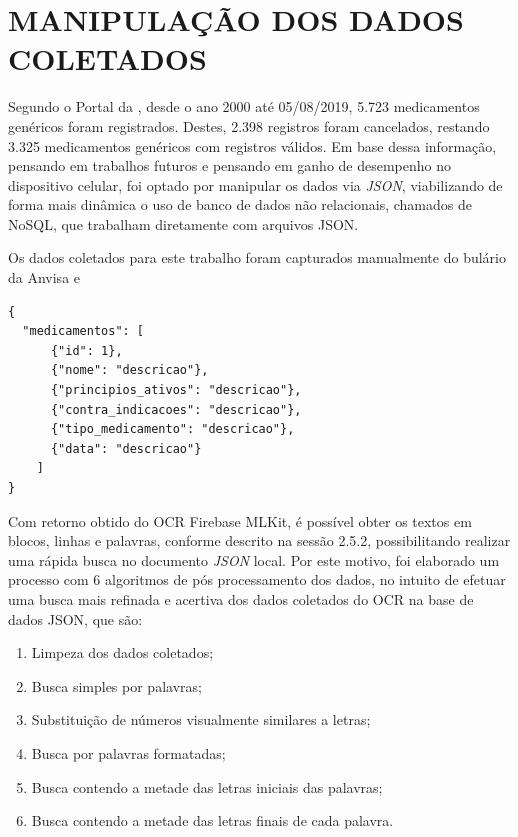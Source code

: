\section{MANIPULAÇÃO DOS DADOS COLETADOS}

Segundo o Portal da , desde o ano 2000 até 05/08/2019, 5.723 medicamentos genéricos foram registrados. Destes, 2.398 registros foram cancelados, restando 3.325 medicamentos genéricos com registros válidos. Em base dessa informação, pensando em trabalhos futuros e pensando em ganho de desempenho no dispositivo celular, foi optado por manipular os dados via \textit{JSON}, viabilizando de forma mais dinâmica o uso de banco de dados não relacionais, chamados de NoSQL, que trabalham diretamente com arquivos JSON.

Os dados coletados para este trabalho foram capturados manualmente do bulário da Anvisa e %

\begin{lstlisting}[firstnumber=1]
{
  "medicamentos": [
      {"id": 1},
      {"nome": "descricao"},
      {"principios_ativos": "descricao"},
      {"contra_indicacoes": "descricao"},
      {"tipo_medicamento": "descricao"},
      {"data": "descricao"}
    ]
}
\end{lstlisting}


Com retorno obtido do OCR Firebase MLKit, é possível obter os textos em blocos, linhas e palavras, conforme descrito na sessão 2.5.2, possibilitando realizar uma rápida busca no documento \textit{JSON} local. Por este motivo, foi elaborado um processo com 6 algoritmos de pós processamento dos dados, no intuito de efetuar uma busca mais refinada e acertiva dos dados coletados do OCR na base de dados JSON, que são:

\begin{enumerate}
  \item Limpeza dos dados coletados;
  \item Busca simples por palavras;
  \item Substituição de números visualmente similares a letras;
  \item Busca por palavras formatadas;
  \item Busca contendo a metade das letras iniciais das palavras;
  \item Busca contendo a metade das letras finais de cada palavra.
\end{enumerate}

